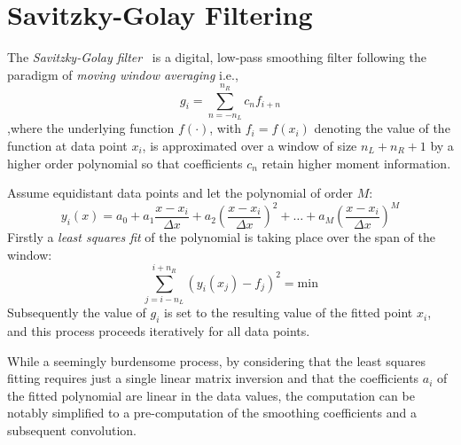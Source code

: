 \section{Savitzky-Golay Filtering} \label{sec:theorBack-SavitzkyGolay}

The \emph{Savitzky-Golay filter}~\cite{SavGol1964SmoothDiff} is a digital, low-pass smoothing filter following the paradigm of \emph{moving window averaging} i.e., 
$$g_i=\sum_{n=-n_L}^{n_R} c_n f_{i+n}$$
,where the underlying function $f(\cdot)$, with $f_i=f(x_i)$ denoting the value of the function at data point $x_i$, is approximated over a window of size $n_L+n_R+1$ by a higher order polynomial so that coefficients $c_n$ retain higher moment information.

Assume equidistant data points and let the polynomial of order $M$: $$ y_i(x)=a_0+a_1 \frac{x-x_i}{\Delta x}+a_2 (\frac{x-x_i}{\Delta x})^2 + \dots + a_M (\frac{x-x_i}{\Delta x})^M $$ 
Firstly a \emph{least squares fit} of the polynomial is taking place over the span of the window:
$$ \sum_{j=i-n_L}^{i+n_R} (y_i(x_j)-f_j)^2= \text{min}$$
Subsequently the value of $g_i$ is set to the resulting value of the fitted point $x_i$, and this process proceeds iteratively for all data points.

While a seemingly burdensome process, by considering that the least squares fitting requires just a single linear matrix inversion and that the coefficients $a_i$ of the fitted polynomial are linear in the data values, the computation can be notably simplified to a pre-computation of the smoothing coefficients and a subsequent convolution.

